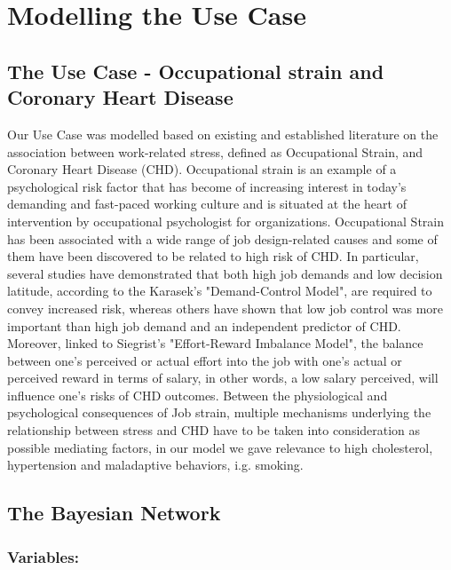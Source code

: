 \section{Modelling the Use Case}
\label{usecase}

\subsection{The Use Case - Occupational strain and Coronary Heart Disease}
Our Use Case was modelled based on existing and established literature on the association between work-related stress, defined as Occupational Strain, and Coronary Heart Disease (CHD). Occupational strain is an example of a psychological risk factor that has become of increasing interest in today's demanding and fast-paced working culture and is situated at the heart of intervention by occupational psychologist for organizations. Occupational Strain has been associated with a wide range of job design-related causes and some of them have been discovered to be related to high risk of CHD. In particular, several studies have demonstrated that both high job demands and low decision latitude, according to the Karasek's "Demand-Control Model", are required to convey increased risk, whereas others have shown that low job control was more important than high job demand and an independent predictor of CHD. Moreover, linked to Siegrist's "Effort-Reward Imbalance Model", the balance between one's perceived or actual effort into the job with one's actual or perceived reward in terms of salary, in other words, a low salary perceived, will influence one's risks of CHD outcomes. Between the physiological and psychological consequences of Job strain, multiple mechanisms underlying the relationship between stress and CHD have to be taken into consideration as possible mediating factors, in our model we gave relevance to high cholesterol, hypertension and maladaptive behaviors, i.g. smoking. ~\cite{ref_article6}

\subsection{The Bayesian Network}


\subsubsection{Variables:}
